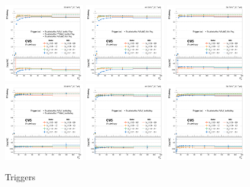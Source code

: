 \begin{figure}[tb]
	\begin{center}
		\includegraphics[width=0.30\textwidth]{fig/SFs/sf1D_year2016_leg1.png}
		\includegraphics[width=0.30\textwidth]{fig/SFs/sf1D_year2017_leg1.png}
		\includegraphics[width=0.30\textwidth]{fig/SFs/sf1D_year2018_leg1.png}
		\includegraphics[width=0.30\textwidth]{fig/SFs/sf1D_year2016_leg2.png}
		\includegraphics[width=0.30\textwidth]{fig/SFs/sf1D_year2017_leg2.png}
		\includegraphics[width=0.30\textwidth]{fig/SFs/sf1D_year2018_leg2.png}
	\end{center}
	\caption{Triggers}
	\label{fig:mu_trig_SF}
\end{figure}


